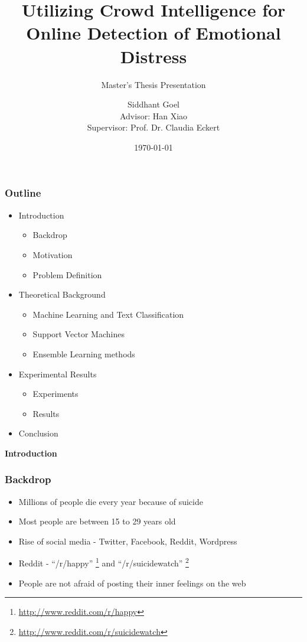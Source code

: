 \documentclass[9pt]{beamer}
\title{Utilizing Crowd Intelligence for Online Detection of Emotional Distress}
\subtitle{Master's Thesis Presentation}
\author[Siddhant Goel]{Siddhant Goel\\{\small Advisor: Han Xiao\\Supervisor: Prof. Dr. Claudia Eckert}}
\institute{
Chair for IT Security\\
Technische Universit\"at M\"unchen
}
\date{\today}
\begin{document}
    \begin{frame}[plain]
        \titlepage
    \end{frame}
    
    \begin{frame}
        \frametitle{Outline}
        \begin{itemize}
            \item{
            Introduction
            \begin{itemize}
                \item{Backdrop}
                \item{Motivation}
                \item{Problem Definition}
            \end{itemize}
            }
            \item{
            Theoretical Background
            \begin{itemize}
                \item{Machine Learning and Text Classification}
                \item{Support Vector Machines}
                \item{Ensemble Learning methods}
            \end{itemize}
            }
            \item{
            Experimental Results
            \begin{itemize}
                \item{Experiments}
                \item{Results}
            \end{itemize}
            }
            \item{Conclusion}
        \end{itemize}
    \end{frame}
    
    \begin{frame}
        \begin{center}
            \textbf{Introduction}
        \end{center}
    \end{frame}
    
    \begin{frame}
        \frametitle{Backdrop}
        \begin{itemize}
            \item{Millions of people die every year because of suicide}
            \item{Most people are between 15 to 29 years old}
            \item{Rise of social media - Twitter, Facebook, Reddit, Wordpress}
            \item{Reddit - ``/r/happy'' \footnote{\url{http://www.reddit.com/r/happy}} and ``/r/suicidewatch'' \footnote{\url{http://www.reddit.com/r/suicidewatch}}}
            \item{People are not afraid of posting their inner feelings on the web}
        \end{itemize}
    \end{frame}
    
\end{document}
